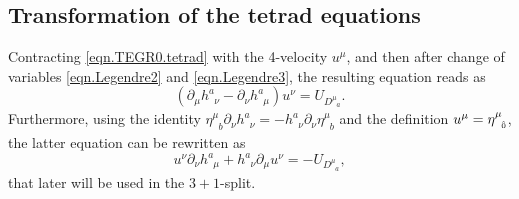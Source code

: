 \documentclass[
10pt, %
a4paper, %
oneside, %
headinclude,footinclude, %
BCOR5mm, %
]{scrartcl}
\newcommand{\tetrsymbol}{h}
\newcommand{\itetrsymbol}{\eta}
\newcommand{\itetr}[2]{\itetrsymbol^{#1}_{\phantom{#1}#2}}
\newcommand{\tetr}[2]{\tetrsymbol^{#1}_{\phantom{#1}#2}}
\newcommand{\D}[1]{\partial_{#1}} %
\newcommand{\Tors}[2]{T^{#1}_{\phantom{a}#2}}
\newcommand{\Dm}[2]{D_{\phantom{#2}#1}^{#2}}	%
\newcommand{\Um}{U}%
\newcommand{\EM}[2]{\Sigma^{#1}_{\phantom{#1}#2}}
\newcommand{\indalg}[1]{\hat{\mathsmaller{#1}}}
\begin{document}
\subsection{Transformation of the tetrad equations}

%
%


Contracting \eqref{eqn.TEGR0.tetrad} with the 4-velocity $ u^\mu $, and then after 
change of variables \eqref{eqn.Legendre2} and \eqref{eqn.Legendre3}, the 
resulting equation reads as
\begin{equation}
	(\D{\mu}\tetr{a}{\nu} - \D{\nu}\tetr{a}{\mu}) u^\nu = \Um_{\Dm{a}{\mu}}.
\end{equation}
Furthermore, using the identity $ \itetr{\mu}{b}\D{\nu}\tetr{a}{\nu} = - 
\tetr{a}{\nu}\D{\nu}\itetr{\mu}{b}$ and the definition $ u^\mu = \itetr{\mu}{\indalg{0}} 
$, the 
latter equation can be rewritten as
\begin{equation}
	u^\nu\D{\nu}\tetr{a}{\mu} + \tetr{a}{\nu}\D{\mu}u^\nu =-\Um_{\Dm{a}{\mu}},
\end{equation}
that later will be used in the $ 3+1 $-split.
\end{document}
